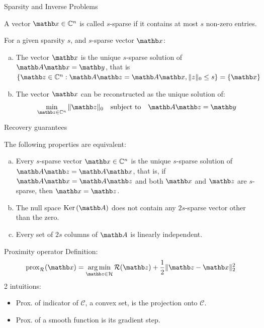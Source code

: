 \begin{frame}{Sparsity and Inverse Problems}
    \begin{definition}[Sparsity]
        A vector $\xb \in \mathbb{C}^n$ is called $s$-sparse if it contains at most $s$ non-zero entries.
    \end{definition}

    \begin{lemma}
        For a given sparsity $s$, and $s$-sparse vector $\xb$:
    \begin{enumerate}[(a)]
        \item The vector $\xb$ is the unique $s$-sparse solution of $\Ab \xb = \yb$, that is $\{\zb \in \mathbb{C}^n : \Ab \zb = \Ab \xb, \|z\|_0 \leq s\} = \{\xb\}$
        \item The vector $\xb$ can be reconstructed as the unique solution of:
        \begin{equation*}
            \label{eq:cs-problem-l0-min}
            \min_{\zb \in \mathbb{C}^n} \|\zb\|_0 \quad \text{subject to} \quad \Ab \zb = \yb
        \end{equation*}
    \end{enumerate}
    \end{lemma}
\end{frame}

\begin{frame}{Recovery guarantees}
    \begin{theorem}
        The following properties are equivalent:
\begin{enumerate}[(a)]
    \item Every $s$-sparse vector $\xb \in \mathbb{C}^n$ is the unique $s$-sparse solution of $\Ab \zb = \Ab \xb$, that is, if $\Ab \xb = \Ab \zb$ and both $\xb$ and $\zb$ are $s$-sparse, then $\xb = \zb$.
    \item The null space $\ker(\Ab)$ does not contain any $2s$-sparse vector other than the zero.
    \item Every set of $2s$ columns of $\Ab$ is linearly independent.
\end{enumerate}
    \end{theorem}
\end{frame}

\begin{frame}{Proximity operator}
    Definition:
    \begin{equation*}
        \operatorname{prox}_{\mathcal{R}}(\xb) = \argmin_{\zb \in \mathcal{H}} \mathcal{R}(\zb) + \frac12\|\zb - \xb\|_2^2
    \end{equation*}
    2 intuitions:
    \begin{itemize}
        \item Prox. of indicator of $\mathcal{C}$, a convex set, is the projection onto $\mathcal{C}$.
        \item Prox. of a smooth function is its gradient step.
    \end{itemize}
\end{frame}

